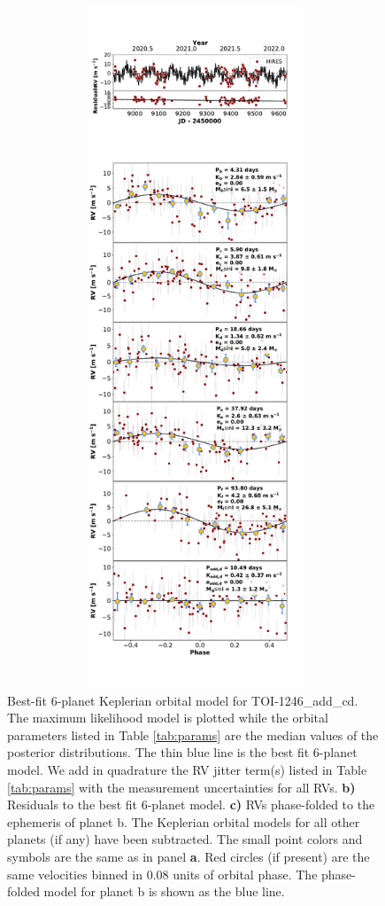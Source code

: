 \documentclass{emulateapj}
\begin{document}
\begin{figure}[!h]
\centering 

\includegraphics[height=8.0in,width=6.0in,keepaspectratio]{TOI-1246_add_cd_rv_multipanel.pdf}
\caption{ Best-fit 6-planet Keplerian orbital model
  for TOI-1246\_add\_cd. The maximum likelihood model is plotted while
  the orbital parameters listed in Table \ref{tab:params} are the
  median values of the posterior distributions.  The thin blue line is
  the best fit 6-planet model. We add in quadrature
  the RV jitter term(s) listed in Table \ref{tab:params} with the
  measurement uncertainties for all RVs.  {\bf b)} Residuals to the
  best fit 6-planet model. {\bf c)} RVs phase-folded
  to the ephemeris of planet b. The Keplerian orbital models for all
  other planets (if any) have been subtracted.  The small point colors
  and symbols are the same as in panel {\bf a}.  Red circles (if
  present) are the same velocities binned in 0.08 units of orbital
  phase.  The phase-folded model for planet b is shown as the blue
  line.}
\end{figure}
 
\end{document}
